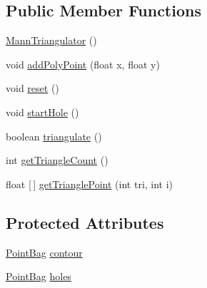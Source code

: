 \subsection*{Public Member Functions}
\begin{DoxyCompactItemize}
\item 
\mbox{\hyperlink{classorg_1_1newdawn_1_1slick_1_1geom_1_1_mann_triangulator_a9581206bc78d27104475b8fba8004fb2}{Mann\+Triangulator}} ()
\item 
void \mbox{\hyperlink{classorg_1_1newdawn_1_1slick_1_1geom_1_1_mann_triangulator_a411808c4fa26392c69dc6c6d370f8b9e}{add\+Poly\+Point}} (float x, float y)
\item 
void \mbox{\hyperlink{classorg_1_1newdawn_1_1slick_1_1geom_1_1_mann_triangulator_a450e5335641bda3d144b0fe4ff8ca499}{reset}} ()
\item 
void \mbox{\hyperlink{classorg_1_1newdawn_1_1slick_1_1geom_1_1_mann_triangulator_a86359f375402b39594c6f2c7a7b46290}{start\+Hole}} ()
\item 
boolean \mbox{\hyperlink{classorg_1_1newdawn_1_1slick_1_1geom_1_1_mann_triangulator_a14301dcfbddc186d4e24dba24dba2535}{triangulate}} ()
\item 
int \mbox{\hyperlink{classorg_1_1newdawn_1_1slick_1_1geom_1_1_mann_triangulator_a3d982150cac3d36cd7c22e146e6c48b3}{get\+Triangle\+Count}} ()
\item 
float \mbox{[}$\,$\mbox{]} \mbox{\hyperlink{classorg_1_1newdawn_1_1slick_1_1geom_1_1_mann_triangulator_a59edd6ad99b277cfe7bf33e466eea504}{get\+Triangle\+Point}} (int tri, int i)
\end{DoxyCompactItemize}
\subsection*{Protected Attributes}
\begin{DoxyCompactItemize}
\item 
\mbox{\hyperlink{classorg_1_1newdawn_1_1slick_1_1geom_1_1_mann_triangulator_1_1_point_bag}{Point\+Bag}} \mbox{\hyperlink{classorg_1_1newdawn_1_1slick_1_1geom_1_1_mann_triangulator_a94eff0c5ad39ce0c232815591fe3f2d8}{contour}}
\item 
\mbox{\hyperlink{classorg_1_1newdawn_1_1slick_1_1geom_1_1_mann_triangulator_1_1_point_bag}{Point\+Bag}} \mbox{\hyperlink{classorg_1_1newdawn_1_1slick_1_1geom_1_1_mann_triangulator_a52a9b8b72ebce44c620dbad2e8285540}{holes}}
\end{DoxyCompactItemize}
